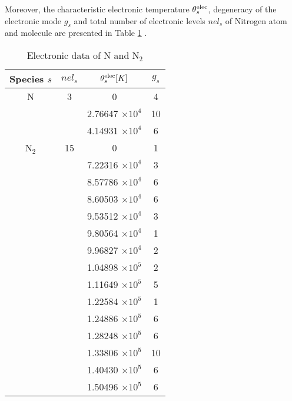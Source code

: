 Moreover, the characteristic electronic temperature $\theta^{\text{elec}}_s$, degeneracy of the electronic mode  $g_s$ and total number of electronic levels $nel_s$ of Nitrogen atom and molecule are presented in Table \ref{table02} \citep{Kirk2011}.
\begin{table}[ht]
\caption{Electronic data of N and N$_2$}
\centering
\begin{tabular}{c c c c}
\hline\hline
Species $s$  &  $nel_s$ & $\theta_{s}^{\text{elec}} [K]$ & $g_s$ \\ [0.5ex]
\hline 
N & 3 &  0   &    4  \\
& &	  2.76647 $\times 10^4$     & 10  \\
& &	  4.14931 $\times 10^4$     & 6  \\
\hline
N$_2$ & 15  &  0  &    1  \\
& &       7.22316 $\times 10^4$  &    3  \\
& &       8.57786 $\times 10^4$  &    6  \\
& &       8.60503 $\times 10^4$  &    6  \\
& &       9.53512 $\times 10^4$  &    3  \\
& &       9.80564 $\times 10^4$  &    1  \\
& &       9.96827 $\times 10^4$  &    2  \\
& &       1.04898 $\times 10^5$  &    2  \\
& &       1.11649 $\times 10^5$  &    5  \\
& &       1.22584 $\times 10^5$  &    1  \\
& &       1.24886 $\times 10^5$  &    6  \\
& &       1.28248 $\times 10^5$  &    6  \\
& &       1.33806 $\times 10^5$  &   10  \\
& &       1.40430 $\times 10^5$  &    6  \\
& &       1.50496 $\times 10^5$  &    6  \\ [.5ex]
\hline
\end{tabular}
\label{table02}
\end{table} 


